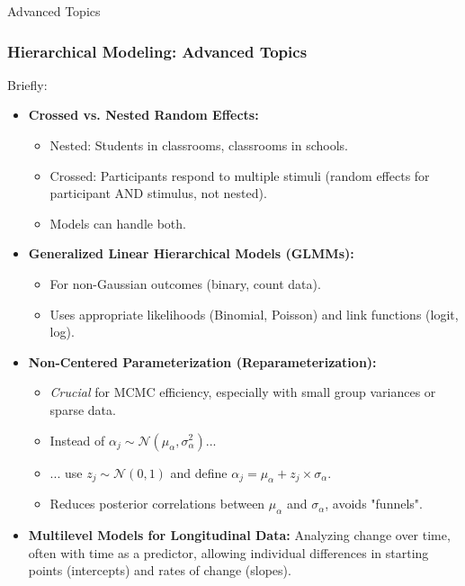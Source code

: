 \documentclass[aspectratio=169]{beamer}
\begin{document}
\begin{frame}[fragile]{Advanced Topics}
    \frametitle{Hierarchical Modeling: Advanced Topics}
    Briefly:
    \begin{itemize}
        \item \textbf{Crossed vs. Nested Random Effects:}
        \begin{itemize}
            \item Nested: Students in classrooms, classrooms in schools.
            \item Crossed: Participants respond to multiple stimuli (random effects for participant AND stimulus, not nested).
            \item Models can handle both.
        \end{itemize}
        \pause
        \item \textbf{Generalized Linear Hierarchical Models (GLMMs):}
        \begin{itemize}
            \item For non-Gaussian outcomes (binary, count data).
            \item Uses appropriate likelihoods (Binomial, Poisson) and link functions (logit, log).
        \end{itemize}
        \pause
        \item \textbf{Non-Centered Parameterization (Reparameterization):}
        \begin{itemize}
            \item \emph{Crucial} for MCMC efficiency, especially with small group variances or sparse data.
            \item Instead of $\alpha_j \sim \mathcal{N}(\mu_{\alpha}, \sigma^2_{\alpha})$...
            \item ... use $z_j \sim \mathcal{N}(0, 1)$ and define $\alpha_j = \mu_{\alpha} + z_j \times \sigma_{\alpha}$.
            \item Reduces posterior correlations between $\mu_{\alpha}$ and $\sigma_{\alpha}$, avoids "funnels".
        \end{itemize}
        \pause
        \item \textbf{Multilevel Models for Longitudinal Data:} Analyzing change over time, often with time as a predictor, allowing individual differences in starting points (intercepts) and rates of change (slopes).
    \end{itemize}
\end{frame}

\maketitle
\end{document}
